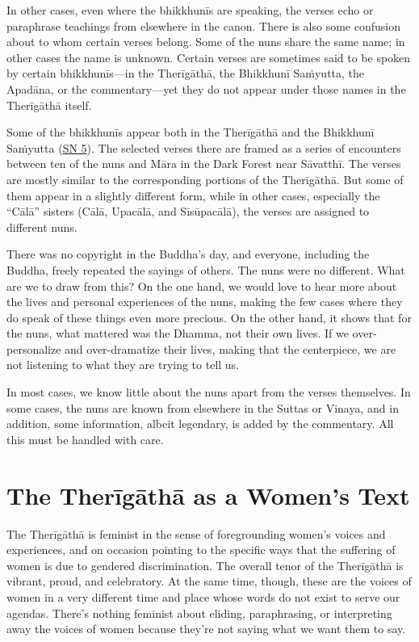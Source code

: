 \documentclass[12pt,openany]{book}%
\begin{document}
In other cases, even where the \textsanskrit{bhikkhunīs} are speaking, the verses echo or paraphrase teachings from elsewhere in the canon. There is also some confusion about to whom certain verses belong. Some of the nuns share the same name; in other cases the name is unknown. Certain verses are sometimes said to be spoken by certain \textsanskrit{bhikkhunīs}—in the \textsanskrit{Therīgāthā}, the \textsanskrit{Bhikkhunī} \textsanskrit{Saṁyutta}, the \textsanskrit{Apadāna}, or the commentary—yet they do not appear under those names in the \textsanskrit{Therīgāthā} itself.

Some of the \textsanskrit{bhikkhunīs} appear both in the \textsanskrit{Therīgāthā} and the \textsanskrit{Bhikkhunī} \textsanskrit{Saṁyutta} (\href{https://suttacentral.net/sn5}{SN 5}). The selected verses there are framed as a series of encounters between ten of the nuns and \textsanskrit{Māra} in the Dark Forest near \textsanskrit{Sāvatthī}. The verses are mostly similar to the corresponding portions of the \textsanskrit{Therīgāthā}. But some of them appear in a slightly different form, while in other cases, especially the “\textsanskrit{Cālā}” sisters (\textsanskrit{Cālā}, \textsanskrit{Upacālā}, and \textsanskrit{Sīsūpacālā}), the verses are assigned to different nuns.

There was no copyright in the Buddha’s day, and everyone, including the Buddha, freely repeated the sayings of others. The nuns were no different. What are we to draw from this? On the one hand, we would love to hear more about the lives and personal experiences of the nuns, making the few cases where they do speak of these things even more precious. On the other hand, it shows that for the nuns, what mattered was the Dhamma, not their own lives. If we over-personalize and over-dramatize their lives, making that the centerpiece, we are not listening to what they are trying to tell us.

In most cases, we know little about the nuns apart from the verses themselves. In some cases, the nuns are known from elsewhere in the Suttas or Vinaya, and in addition, some information, albeit legendary, is added by the commentary. All this must be handled with care.

\section*{The \textsanskrit{Therīgāthā} as a Women’s Text}

The \textsanskrit{Therīgāthā} is feminist in the sense of foregrounding women’s voices and experiences, and on occasion pointing to the specific ways that the suffering of women is due to gendered discrimination. The overall tenor of the \textsanskrit{Therīgāthā} is vibrant, proud, and celebratory. At the same time, though, these are the voices of women in a very different time and place whose words do not exist to serve our agendas. There’s nothing feminist about eliding, paraphrasing, or interpreting away the voices of women because they’re not saying what we want them to say.
\end{document}
